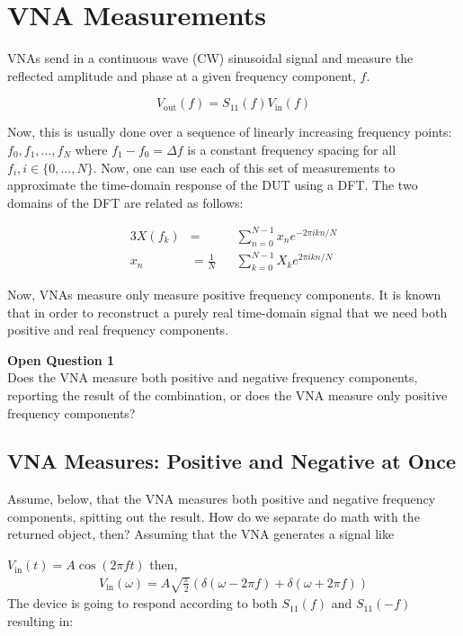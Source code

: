 \section{VNA Measurements}
\label{sec:vna_measurements}
VNAs send in a continuous wave (CW) sinusoidal signal and measure the reflected
amplitude and phase at a given frequency component, $ f $.

\[
   V_{\text{out}}(f) = S_{\text{11}}(f)V_{\text{in}}(f)
\]

Now, this is usually done over a sequence of linearly increasing frequency
points: $ f_0, f_1 , \ldots , f_N $ where $ f_1 - f_0 = \Delta f $ is a constant
frequency spacing for all $ f_i, i \in \{ 0,...,N \}$. Now, one can use each of
this set of measurements to approximate the time-domain response of the DUT
using a DFT. The two domains of the DFT are related as follows:

\begin{alignat*}{3}
   X(f_k) &= &&\sum^{N-1}_{n=0} x_n e^{-2 \pi i k n / N} \\
   x_n &= \frac{1}{N} &&\sum^{N-1}_{k=0} X_k e^{2\pi i k n / N}
\end{alignat*}

Now, VNAs measure only measure positive frequency components. It is known that
in order to reconstruct a purely real time-domain signal that we need both
positive and real frequency components.

\begin{framed}
   \textbf{Open Question 1} \\
   Does the VNA measure both positive and negative frequency components,
   reporting the result of the combination, or does the VNA measure only positive frequency
   components?
\end{framed}

\subsection{VNA Measures: Positive and Negative at Once}
\label{sub:vna_measures_positive_and_negative_at_once}
Assume, below, that the VNA measures both positive and negative frequency
components, spitting out the result. How do we separate do math with the
returned object, then? Assuming that the VNA generates a signal like

$ V_{\text{in}}(t) = A \cos(2 \pi f t) $ then,
\begin{align*}
   V_{\text{in}}(\omega) = A\sqrt{\frac{\pi}{2}} \left( \delta(\omega - 2\pi f) +
   \delta(\omega + 2\pi f) \right)
\end{align*}
The device is going to respond according to both $ S_{11}(f) $ and $
S_{11}(-f) $ resulting in:

